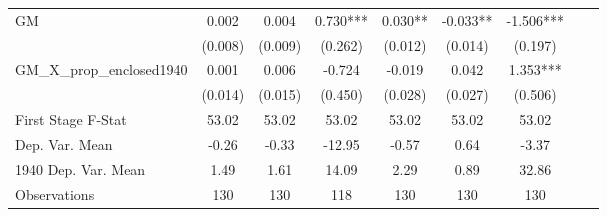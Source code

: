 \begin{tabular}{l*{8}{c}}
\cmidrule(lr){1-7}
GM              &    0.002   &    0.004   &    0.730***&    0.030** &   -0.033** &   -1.506***\\
                &  (0.008)   &  (0.009)   &  (0.262)   &  (0.012)   &  (0.014)   &  (0.197)   \\
\addlinespace
GM\_X\_prop\_enclosed1940&    0.001   &    0.006   &   -0.724   &   -0.019   &    0.042   &    1.353***\\
                &  (0.014)   &  (0.015)   &  (0.450)   &  (0.028)   &  (0.027)   &  (0.506)   \\
\midrule
First Stage F-Stat&    53.02   &    53.02   &    53.02   &    53.02   &    53.02   &    53.02   \\
Dep. Var. Mean  &    -0.26   &    -0.33   &   -12.95   &    -0.57   &     0.64   &    -3.37   \\
1940 Dep. Var. Mean&     1.49   &     1.61   &    14.09   &     2.29   &     0.89   &    32.86   \\
Observations    &      130   &      130   &      118   &      130   &      130   &      130   \\
 \bottomrule \end{tabular}
